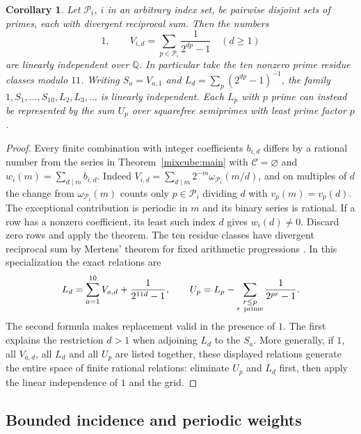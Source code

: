 \documentclass[11pt,letterpaper]{article}
\newtheorem{corollary}[theorem]{Corollary}
\begin{document}
\begin{corollary}\label{mixcube:grid}
Let $\mathcal P_i$, $i$ in an arbitrary index set, be pairwise disjoint
sets of primes, each with divergent reciprocal sum. Then the numbers
\[
 1,\qquad V_{i,d}=\sum_{p\in\mathcal P_i}\frac1{2^{dp}-1}
            \quad (d\ge1)
\]
are linearly independent over $\mathbb Q$. In particular take the ten
nonzero prime residue classes modulo $11$. Writing $S_a=V_{a,1}$ and
$L_d=\sum_p(2^{dp}-1)^{-1}$, the family
$1,S_1,\ldots,S_{10},L_2,L_3,\ldots$ is linearly independent.
Each $L_p$ with $p$ prime can instead be represented by the sum $U_p$
over squarefree semiprimes with least prime factor $p$.
\end{corollary}
\begin{proof}
Every finite combination with integer coefficients $b_{i,d}$ differs
by a rational number from the series in Theorem~\ref{mixcube:main}
with $\mathcal C=\varnothing$ and $w_i(m)=\sum_{d\mid m}b_{i,d}$.
Indeed $V_{i,d}=\sum_{d\mid m}2^{-m}\omega_{\mathcal P_i}(m/d)$, and
on multiples of $d$ the change from $\omega_{\mathcal P_i}(m)$ counts
only $p\in\mathcal P_i$ dividing $d$ with $v_p(m)=v_p(d)$. The
exceptional contribution is periodic in $m$ and its binary series is
rational. If a row has a nonzero coefficient, its least such index
$d$ gives $w_i(d)\ne0$. Discard zero rows and apply the theorem. The
ten residue classes have divergent reciprocal sum by Mertens' theorem
for fixed arithmetic progressions \cite{williams}. In this specialization the exact
relations are
\[
 L_d=\sum_{a=1}^{10} V_{a,d}+\frac1{2^{11d}-1},\qquad
 U_p=L_p-\sum_{\substack{r\le p\\r\ {\rm prime}}}\frac1{2^{pr}-1}.
\]
The second formula makes replacement valid in the presence of $1$.
The first explains the restriction $d>1$ when adjoining $L_d$ to the
$S_a$. More generally, if $1$, all $V_{a,d}$, all $L_d$ and all $U_p$
are listed together, these displayed relations generate the entire
space of finite rational relations: eliminate $U_p$ and $L_d$ first,
then apply the linear independence of $1$ and the grid.
\end{proof}

\subsection{Bounded incidence and periodic weights}
\end{document}
